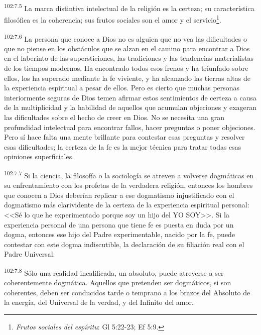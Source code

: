 \par
\textsuperscript{102:7.5} La marca distintiva intelectual de la religión es la certeza; su característica filosófica es la coherencia; sus frutos sociales son el amor y el servicio\footnote{\textit{Frutos sociales del espíritu}: Gl 5:22-23; Ef 5:9.}.

\par
\textsuperscript{102:7.6} La persona que conoce a Dios no es alguien que no vea las dificultades o que no piense en los obstáculos que se alzan en el camino para encontrar a Dios en el laberinto de las supersticiones, las tradiciones y las tendencias materialistas de los tiempos modernos. Ha encontrado todos esos frenos y ha triunfado sobre ellos, los ha superado mediante la fe viviente, y ha alcanzado las tierras altas de la experiencia espiritual a pesar de ellos. Pero es cierto que muchas personas interiormente seguras de Dios temen afirmar estos sentimientos de certeza a causa de la multiplicidad y la habilidad de aquellos que acumulan objeciones y exageran las dificultades sobre el hecho de creer en Dios. No se necesita una gran profundidad intelectual para encontrar fallos, hacer preguntas o poner objeciones. Pero sí hace falta una mente brillante para contestar esas preguntas y resolver esas dificultades; la certeza de la fe es la mejor técnica para tratar todas esas opiniones superficiales.

\par
\textsuperscript{102:7.7} Si la ciencia, la filosofía o la sociología se atreven a volverse dogmáticas en su enfrentamiento con los profetas de la verdadera religión, entonces los hombres que conocen a Dios deberían replicar a ese dogmatismo injustificado con el dogmatismo más clarividente de la certeza de la experiencia espiritual personal: <<Sé lo que he experimentado porque soy un hijo del YO SOY>>. Si la experiencia personal de una persona que tiene fe es puesta en duda por un dogma, entonces ese hijo del Padre experimentable, nacido por la fe, puede contestar con este dogma indiscutible, la declaración de su filiación real con el Padre Universal.

\par
\textsuperscript{102:7.8} Sólo una realidad incalificada, un absoluto, puede atreverse a ser coherentemente dogmática. Aquellos que pretenden ser dogmáticos, si son coherentes, deben ser conducidos tarde o temprano a los brazos del Absoluto de la energía, del Universal de la verdad, y del Infinito del amor.


